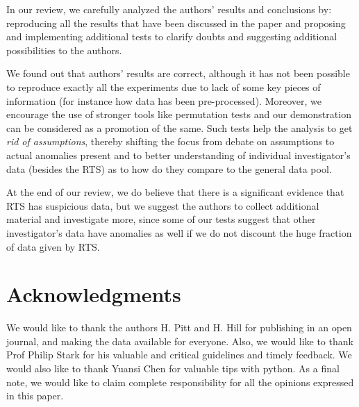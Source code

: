 \documentclass{article}
\begin{document}
In our review, we carefully analyzed the authors' results
and conclusions by: reproducing all the results that have been
discussed in the paper and proposing and implementing additional tests to
clarify doubts and suggesting additional possibilities to the authors.

We found out that authors' results are correct, although it has not been
possible to reproduce exactly all the experiments due to lack of some
key pieces of information (for instance how data has been
pre-processed). Moreover, we encourage the use of stronger tools like permutation tests and our demonstration can be considered as a promotion of the same. Such tests help the analysis to get \textit{rid of assumptions}, thereby shifting the focus from debate on assumptions to actual anomalies present and to better understanding of individual
investigator's data (besides the RTS) as to how do they compare to the general data pool.

At the end of our review, we do believe that there is a significant evidence that RTS has suspicious data, but we suggest the authors to collect additional material and investigate more, since some of our tests suggest that other investigator's
data have anomalies as well if we do not discount the huge fraction of data given by RTS.

\section*{Acknowledgments} %
\label{sec:acknowledgments}

We would like to thank the authors H. Pitt and H. Hill for publishing in an open journal, and making the data available for everyone. Also, we would like to thank Prof Philip Stark for his valuable and critical guidelines and timely feedback. We would also like to thank Yuansi Chen for valuable tips with python. As a final note, we would like to claim complete responsibility for all the opinions expressed in this paper.






    
\end{document}
